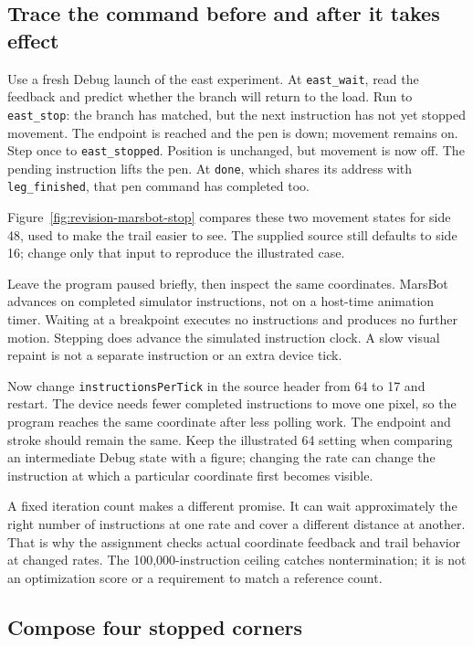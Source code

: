 \subsection*{Trace the command before and after it takes effect}

Use a fresh Debug launch of the east experiment. At \texttt{east\_wait}, read the
feedback and predict whether the branch will return to the load. Run to
\texttt{east\_stop}: the branch has matched, but the next instruction has not yet
stopped movement. The endpoint is reached and the pen is down; movement remains
on. Step once to \texttt{east\_stopped}. Position is unchanged, but movement is
now off. The pending instruction lifts the pen. At \texttt{done}, which shares its address with \texttt{leg\_finished}, that
pen command has completed too.

Figure~\ref{fig:revision-marsbot-stop} compares these two movement states for
side 48, used to make the trail easier to see. The supplied source still defaults
to side 16; change only that input to reproduce the illustrated case.



Leave the program paused briefly, then inspect the same coordinates. MarsBot
advances on completed simulator instructions, not on a host-time animation timer.
Waiting at a breakpoint executes no instructions and produces no further motion.
Stepping does advance the simulated instruction clock. A slow visual repaint is
not a separate instruction or an extra device tick.

Now change \texttt{instructionsPerTick} in the source header from 64 to 17 and
restart. The device needs fewer completed instructions to move one pixel, so the
program reaches the same coordinate after less polling work. The endpoint and
stroke should remain the same. Keep the illustrated 64 setting when comparing
an intermediate Debug state with a figure; changing the rate can change the
instruction at which a particular coordinate first becomes visible.

A fixed iteration count makes a different promise. It can wait approximately
the right number of instructions at one rate and cover a different distance at
another. That is why the assignment checks actual coordinate feedback and trail
behavior at changed rates. The 100,000-instruction ceiling catches nontermination;
it is not an optimization score or a requirement to match a reference count.

\subsection*{Compose four stopped corners}

